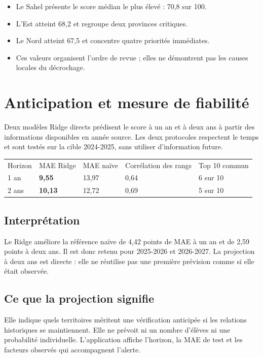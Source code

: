 \documentclass[12pt,a4paper]{article}
\begin{document}
\begin{itemize}
  \item Le Sahel présente le score médian le plus élevé : 70,8 sur 100.
  \item L'Est atteint 68,2 et regroupe deux provinces critiques.
  \item Le Nord atteint 67,5 et concentre quatre priorités immédiates.
  \item Ces valeurs organisent l'ordre de revue ; elles ne démontrent pas les causes locales du décrochage.
\end{itemize}
\clearpage
\thispagestyle{fancy}

\section{Anticipation et mesure de fiabilité}
Deux modèles Ridge directs prédisent le score à un an et à deux ans à partir des informations disponibles en année source. Les deux protocoles respectent le temps et sont testés sur la cible 2024-2025, sans utiliser d'information future.

\begin{tabularx}{\textwidth}{p{2.4cm} p{2.4cm} p{2.5cm} p{2.7cm} X}
\rowcolor{Navy}\color{white}Horizon & \color{white}MAE Ridge & \color{white}MAE naïve & \color{white}Corrélation des rangs & \color{white}Top 10 commun\\
1 an & \textbf{9,55} & 13,97 & 0,64 & 6 sur 10\\
2 ans & \textbf{10,13} & 12,72 & 0,69 & 5 sur 10\\
\end{tabularx}

\subsection{Interprétation}
Le Ridge améliore la référence naïve de 4,42 points de MAE à un an et de 2,59 points à deux ans. Il est donc retenu pour 2025-2026 et 2026-2027. La projection à deux ans est directe : elle ne réutilise pas une première prévision comme si elle était observée.

\subsection{Ce que la projection signifie}
Elle indique quels territoires méritent une vérification anticipée si les relations historiques se maintiennent. Elle ne prévoit ni un nombre d'élèves ni une probabilité individuelle. L'application affiche l'horizon, la MAE de test et les facteurs observés qui accompagnent l'alerte.
\end{document}
